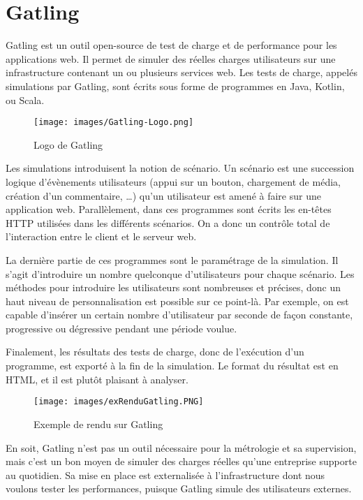 \documentclass[oneside,12pt]{report}
\begin{document}
\section{Gatling}

Gatling est un outil open-source de test de charge et de performance pour les applications web. Il permet de simuler des réelles charges utilisateurs sur une infrastructure contenant un ou plusieurs services web. Les tests de charge, appelés simulations par Gatling, sont écrits sous forme de programmes en Java, Kotlin, ou Scala. 
\newline

\begin{figure}[!ht]
    \centering
    \texttt{[image: images/Gatling-Logo.png]}
    \caption{Logo de Gatling}
    \label{fig:mesh1}
\end{figure}

Les simulations introduisent la notion de scénario. Un scénario est une succession logique d'évènements utilisateurs (appui sur un bouton, chargement de média, création d'un commentaire, …) qu'un utilisateur est amené à faire sur une application web. Parallèlement, dans ces programmes sont écrits les en-têtes HTTP utilisées dans les différents scénarios. On a donc un contrôle total de l'interaction entre le client et le serveur web.
\newline

La dernière partie de ces programmes sont le paramétrage de la simulation. Il s'agit d'introduire un nombre quelconque d'utilisateurs pour chaque scénario. Les méthodes pour introduire les utilisateurs sont nombreuses et précises, donc un haut niveau de personnalisation est possible sur ce point-là. Par exemple, on est capable d'insérer un certain nombre d'utilisateur par seconde de façon constante, progressive ou dégressive pendant une période voulue. 
\newline

Finalement, les résultats des tests de charge, donc de l'exécution d'un programme, est exporté à la fin de la simulation. Le format du résultat est en HTML, et il est plutôt plaisant à analyser.
\newline

\begin{figure}[!ht]
    \centering
    \texttt{[image: images/exRenduGatling.PNG]}
    \caption{Exemple de rendu sur Gatling}
    \label{fig:mesh1}
\end{figure}

En soit, Gatling n'est pas un outil nécessaire pour la métrologie et sa supervision, mais c'est un bon moyen de simuler des charges réelles qu'une entreprise supporte au quotidien. Sa mise en place est externalisée à l'infrastructure dont nous voulons tester les performances, puisque Gatling simule des utilisateurs externes.
\end{document}
